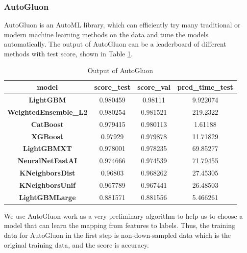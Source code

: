 \documentclass{article}
\begin{document}
\subsubsection{AutoGluon\cite{agtabular}}
AutoGluon\cite{agtabular} is an AutoML library, which can efficiently try many traditional or modern machine learning methods on the data and tune the models automatically. The output of AutoGluon can be a leaderboard of different methods with test score, shown in Table \ref{tab:leaderboard}. 
\begin{table}[h]
\centering
\caption{Output of AutoGluon}
\label{tab:leaderboard}
\begin{tabular}{|c|c|c|c|}
\hline
\textbf{model}                & \textbf{score\_test} & \textbf{score\_val} & \textbf{pred\_time\_test} \\ \hline
\textbf{LightGBM\cite{NIPS2017_6449f44a}}             & 0.980459             & 0.98111             & 9.922074                  \\ \hline
\textbf{WeightedEnsemble\_L2} & 0.980254             & 0.981521            & 219.2322                  \\ \hline
\textbf{CatBoost\cite{prokhorenkova2019catboost}}             & 0.979415             & 0.980113            & 1.61188                   \\ \hline
\textbf{XGBoost \cite{10.1145/2939672.2939785}}              & 0.97929              & 0.979878            & 11.71829                  \\ \hline
\textbf{LightGBMXT}           & 0.978001             & 0.978235            & 69.85277                  \\ \hline
\textbf{NeuralNetFastAI}      & 0.974666             & 0.974539            & 71.79455                  \\ \hline
\textbf{KNeighborsDist}       & 0.96803              & 0.968262            & 27.45305                  \\ \hline
\textbf{KNeighborsUnif}       & 0.967789             & 0.967441            & 26.48503                  \\ \hline
\textbf{LightGBMLarge}        & 0.881571             & 0.881556            & 5.466261                  \\ \hline
\end{tabular}%

\end{table}

We use AutoGluon work as a very preliminary algorithm to help us to choose a model that can learn the mapping from features to labels. Thus, the training data for AutoGluon in the first step is non-down-sampled data which is the original training data, and the score is accuracy. 
\end{document}

